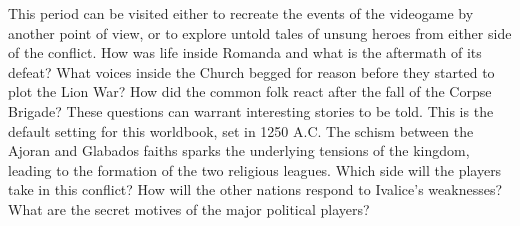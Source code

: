 \begin{multicols}{2}
This period can be visited either to recreate the events of the videogame by another point of view, or to explore untold tales of unsung heroes from either side of the conflict.
How was life inside Romanda and what is the aftermath of its defeat? 
What voices inside the Church begged for reason before they started to plot the Lion War?
How did the common folk react after the fall of the Corpse Brigade? 
These questions can warrant interesting stories to be told.
%
\ofpar
%
This is the default setting for this worldbook, set in 1250 A.C.
The schism between the Ajoran and Glabados faiths sparks the underlying tensions of the kingdom, leading to the formation of the two religious leagues. 
Which side will the players take in this conflict? 
How will the other nations respond to Ivalice’s weaknesses? 
What are the secret motives of the major political players?
%
\end{multicols}
%
\vfill
%
\hspace*{\fill}\hspace*{\fill}\\
%
\twocolumn
\clearpage
%
